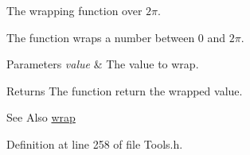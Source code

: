 The wrapping function over $2\pi$. 

The function wraps a number between 0 and $2\pi$.


\begin{DoxyParams}{Parameters}
{\em value} & The value to wrap. \\
\hline
\end{DoxyParams}
\begin{DoxyReturn}{Returns}
The function return the wrapped value.
\end{DoxyReturn}
\begin{DoxySeeAlso}{See Also}
\hyperlink{namespace_hoa2_d_afd27612b742142b67ede5e8832a23b84}{wrap} 
\end{DoxySeeAlso}


Definition at line 258 of file Tools.\-h.

